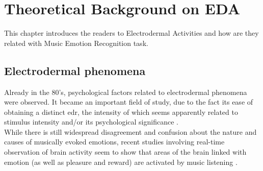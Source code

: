 \chapter{Theoretical Background on EDA}
\label{chap:TheoreticalBackgroundEDA}
\pagestyle{plain}
\vspace{0.5cm}

\noindent This chapter introduces the readers to Electrodermal Activities and how are they related with Music Emotion Recognition task.

\section{Electrodermal phenomena}
Already in the 80's, psychological factors related to electrodermal phenomena were observed. It became an important field of study, due to the fact its ease of obtaining a distinct \gls{edr}, the intensity of which seems apparently related to stimulus intensity and/or its psychological significance \cite{boucsein2012electrodermal}.
\\ \indent
While there is still widespread disagreement and confusion about the nature and causes of musically evoked emotions, recent studies involving real-time observation of brain activity seem to show that areas of the brain linked with emotion (as well as pleasure and reward) are activated by music listening \cite{trost2012mapping}.

